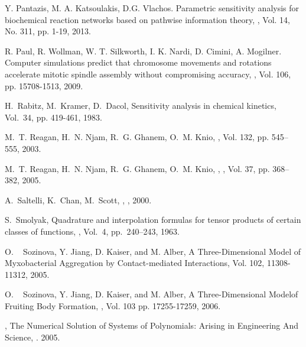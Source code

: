 \begin{thebibliography}{99}
Y. Pantazis, M. A. Katsoulakis, D.G. Vlachos. 
\newblock Parametric sensitivity analysis for biochemical reaction 
networks based on pathwise information theory, , Vol. 14, No. 311, pp.
1-19, 2013.

R. Paul, R. Wollman, W. T. Silkworth, I. K. Nardi, D. Cimini, A.
Mogilner. \newblock Computer simulations predict that chromosome
movements and rotations accelerate mitotic spindle assembly without
compromising accuracy, , Vol. 106, pp.
15708-1513, 2009.

\newblock H.~Rabitz, M.~Kramer, D.~Dacol, Sensitivity analysis in chemical kinetics,
 Vol.~34, pp. 419-461, 1983.


\newblock M.~T. Reagan, H.~N. Njam, R.~G. Ghanem, O.~M. Knio, ,
 Vol. 132, pp. 545--555, 2003.

\newblock M.~T. Reagan, H.~N. Njam, R.~G. Ghanem, O.~M. Knio, , , Vol. 37, pp. 368--382, 2005.



\newblock A.~Saltelli, K.~Chan, M.~Scott, , , 2000.

\newblock S.~Smolyak, \newblock Quadrature and interpolation formulas for tensor products of
\newblock  certain classes of functions, , Vol.~4,  pp.~240--243, 1963.

\newblock O. ~ Sozinova, Y. Jiang, D. Kaiser, and M. Alber, \newblock A Three-Dimensional Model of Myxobacterial Aggregation by
Contact-mediated Interactions, 
Vol. 102, 11308-11312, 2005.

\newblock O. ~ Sozinova, Y. Jiang, D. Kaiser, and M. Alber, \newblock A
Three-Dimensional Modelof Fruiting Body Formation,
, Vol. 103 pp. 17255-17259, 2006.

, \newblock The Numerical Solution of
Systems of Polynomials: Arising in Engineering And Science,
. 2005.


\end{thebibliography}
